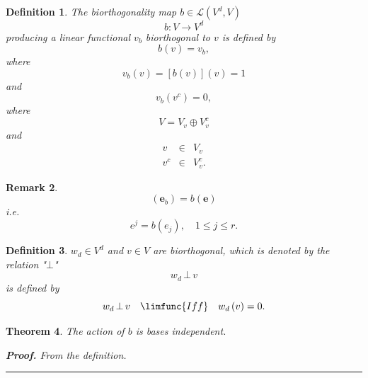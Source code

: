 \documentclass[aps,preprint]{revtex4}
\newtheorem{theorem}{Theorem}
\newtheorem{definition}[theorem]{Definition}
\newtheorem{remark}[theorem]{Remark}
\newenvironment{proof}[1][Proof]{\noindent\textbf{#1.} }{\ \rule{0.5em}{0.5em}}
\begin{document}
\begin{definition}
\label{Biorthogonality Map} The biorthogonality map $b\in \mathcal{L}\left(
V^{d},V\right) $ 
\begin{equation}
b:V\rightarrow V^{d}
\end{equation}%
producing a linear functional $v_{b}$ biorthogonal to $v$ is defined by 
\begin{equation}
b\left( v\right) =v_{b},
\end{equation}%
where%
\begin{equation}
v_{b}\left( v\right) =\left[ b\left( v\right) \right] \left( v\right) =1
\end{equation}%
and%
\begin{equation}
v_{b}\left( v^{c}\right) =0,
\end{equation}%
where%
\begin{equation}
V=V_{v}\oplus V_{v}^{c}
\end{equation}%
and 
\begin{eqnarray}
v &\in &V_{v} \\
v^{c} &\in &V_{v}^{c}.
\end{eqnarray}
\end{definition}

\begin{remark}
\begin{equation}
\left( \boldsymbol{e}_{b}\right) =b\left( \boldsymbol{e}\right)
\end{equation}%
i.e. 
\begin{equation}
e^{j}=b\left( e_{j}\right) ,\quad 1\leq j\leq r.
\end{equation}
\end{remark}

\begin{definition}
$w_{d}\in V^{d}$ and $v\in V$ are biorthogonal, which is denoted by the
relation "$\bot $" 
\begin{equation}
w_{d}\,\bot \,v
\end{equation}%
is defined by 
\begin{equation}
w_{d}\,\bot \,v\quad \limfunc{Iff}\quad w_{d}\left( v\right) =0.
\end{equation}
\end{definition}

\begin{theorem}
The action of $b$ is bases independent.

\begin{proof}
From the definition.
\end{proof}
\end{theorem}
\end{document}
